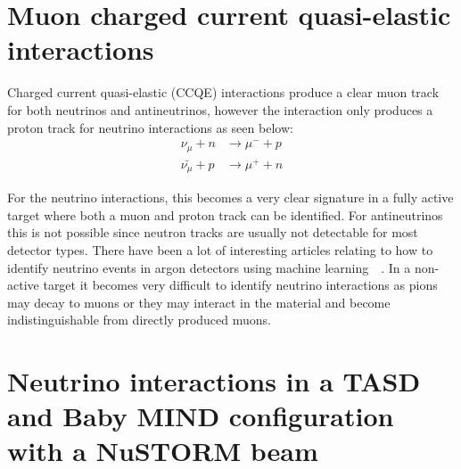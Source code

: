 \section{Muon charged current quasi-elastic interactions}

Charged current quasi-elastic (CCQE) interactions produce a clear muon track for both neutrinos and antineutrinos, however the interaction only produces a proton track for neutrino interactions as seen below:
\begin{align}
\nu_\mu + n &\rightarrow \mu^- + p\\
 \bar{\nu_\mu} + p &\rightarrow \mu^+ + n
\end{align}

For the neutrino interactions, this becomes a very clear signature in a fully active target where both a muon and proton track can be identified. For antineutrinos this is not possible since neutron tracks are usually not detectable for most detector types.
There have been a lot of interesting articles relating to how to identify neutrino events in argon detectors using machine learning~\cite{83Radovic2018}~\cite{84Adams}. In a non-active target it becomes very difficult to identify neutrino interactions as pions may decay to muons or they may interact in the material and become indistinguishable from directly produced muons.





\pagebreak
\section{Neutrino interactions in a TASD and Baby MIND configuration with a NuSTORM beam}

